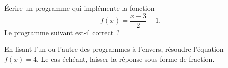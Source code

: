 
\begin{exercice}\label{exosmath-0007}

    Écrire un programme qui implémente la fonction
    \begin{equation}
        f(x)=\frac{ x-3 }{ 2 }+1.
    \end{equation}
    Le programme suivant est-il correct ?



En lisant l'un ou l'autre des programmes à l'envers, résoudre l'équation \( f(x)=4\). Le cas échéant, laisser la réponse sous forme de fraction.

\end{exercice}
